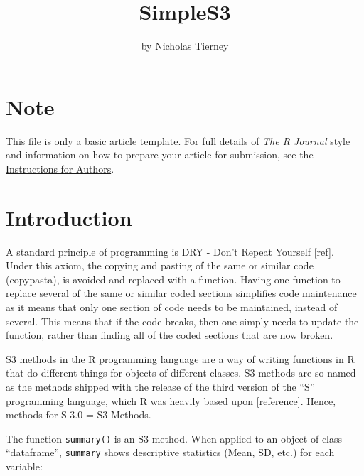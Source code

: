 \title{SimpleS3}
\author{by Nicholas Tierney}

\maketitle


\section{Note}\label{note}

This file is only a basic article template. For full details of
\emph{The R Journal} style and information on how to prepare your
article for submission, see the
\href{https://journal.r-project.org/share/author-guide.pdf}{Instructions
for Authors}.

\section{Introduction}\label{introduction}

A standard principle of programming is DRY - Don't Repeat Yourself
{[}ref{]}. Under this axiom, the copying and pasting of the same or
similar code (copypasta), is avoided and replaced with a function.
Having one function to replace several of the same or similar coded
sections simplifies code maintenance as it means that only one section
of code needs to be maintained, instead of several. This means that if
the code breaks, then one simply needs to update the function, rather
than finding all of the coded sections that are now broken.

S3 methods in the R programming language are a way of writing functions
in R that do different things for objects of different classes. S3
methods are so named as the methods shipped with the release of the
third version of the ``S'' programming language, which R was heavily
based upon {[}reference{]}. Hence, methods for S 3.0 = S3 Methods.

The function \texttt{summary()} is an S3 method. When applied to an
object of class ``dataframe'', \texttt{summary} shows descriptive
statistics (Mean, SD, etc.) for each variable:


